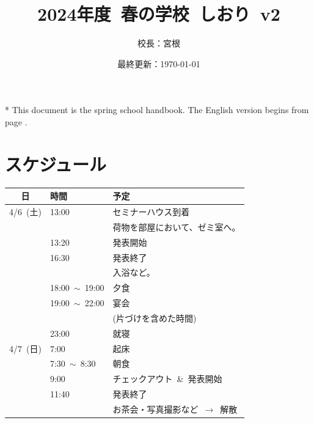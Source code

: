 \documentclass[unicode,a4paper,11pt]{ltjsarticle}
\title{
    2024年度\ 春の学校\ しおり\ v2
}
\author{
  校長：宮根
}
\date{最終更新：\today}
\begin{document}
\maketitle

* This document is the spring school handbook. The English version begins from page \pageref{eng_page}.

\tableofcontents



\clearpage

\section{スケジュール}

\begin{center}
  \begin{tabular}{cll}\hline
    日        & 時間                 & 予定                                      \\ \hline
    4/6\ (土) & 13:00                & セミナーハウス到着                        \\
              &                      & 荷物を部屋において、ゼミ室へ。            \\
              & 13:20                & 発表開始                                  \\
              & 16:30                & 発表終了                                  \\
              &                      & 入浴など。                                \\
              & 18:00\ $\sim$\ 19:00 & 夕食                                      \\
              & 19:00\ $\sim$\ 22:00 & 宴会                                      \\
              &                      & (片づけを含めた時間)                      \\
              & 23:00                & 就寝                                      \\ \hline
    4/7\ (日) & 7:00                 & 起床                                      \\
              & 7:30\ $\sim$\  8:30  & 朝食                                      \\
              & 9:00                 & チェックアウト\ \&\ 発表開始              \\
              & 11:40                & 発表終了                                  \\
              &                      & お茶会・写真撮影など\ $\rightarrow$\ 解散 \\ \hline
  \end{tabular}
\end{center}
\end{document}
